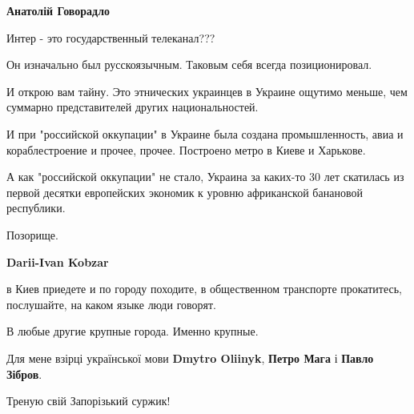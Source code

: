 \begin{itemize}
\begin{itemize}
 
\textbf{Анатолій Говорадло} 

Интер - это государственный телеканал???

Он изначально был русскоязычным. Таковым себя всегда позиционировал.

И открою вам тайну. Это этнических украинцев в Украине ощутимо меньше, чем
суммарно представителей других национальностей.

И при "российской оккупации" в Украине была создана промышленность, авиа и
кораблестроение и прочее, прочее. Построено метро в Киеве и Харькове.

А как "российской оккупации" не стало, Украина за каких-то 30 лет скатилась из
первой десятки европейских экономик к уровню африканской банановой республики.

Позорище.

 
\textbf{Darii-Ivan Kobzar} 

в Киев приедете и по городу походите, в общественном транспорте прокатитесь,
послушайте, на каком языке люди говорят.

В любые другие крупные города. Именно крупные.

\end{itemize}

 

Для мене взірці української мови \textbf{Dmytro Oliinyk}, \textbf{Петро Мага} і \textbf{Павло Зібров}.

Треную свій Запорізький суржик!

\begin{itemize}
 

\end{itemize}
\end{itemize}
